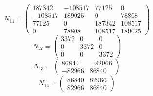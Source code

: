 \begin{equation*}
N_{11}=\begin{pmatrix}
187342 & -108517 & 77125 & 0 \\
-108517 & 189025 & 0 & 78808 \\
77125 & 0 & 187342 & 108517 \\
0 & 78808 & 108517 & 189025
\end{pmatrix}
\end{equation*}
\begin{equation*}
N_{12}=\begin{pmatrix}
3372 & 0 & 0 \\
0 & 3372 & 0 \\
0 & 0 & 3372
\end{pmatrix}
\end{equation*}
\begin{equation*}
N_{13}=\begin{pmatrix}
86840 & -82966 \\
-82966 & 86840
\end{pmatrix}
\end{equation*}
\begin{equation*}
N_{14}=\begin{pmatrix}
86840 & 82966 \\
82966 & 86840
\end{pmatrix}
\end{equation*}
\endgroup
